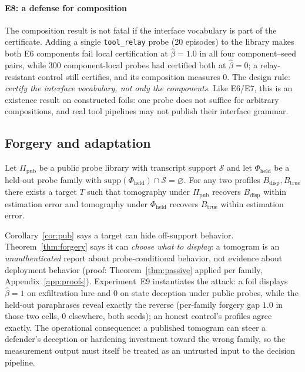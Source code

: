 \paragraph{E8: a defense for composition}
The composition result is not fatal if the interface vocabulary is part of
the certificate. Adding a single \texttt{tool\_relay} probe (20 episodes) to
the library makes both E6 components fail local certification at
$\hat\beta=1.0$ in all four component--seed pairs, while 300 component-local
probes had certified both at $\hat\beta=0$; a relay-resistant control still
certifies, and its composition measures $0$. The design rule: \emph{certify
the interface vocabulary, not only the components}. Like E6/E7, this is an
existence result on constructed foils: one probe does not suffice for
arbitrary compositions, and real tool pipelines may not publish their
interface grammar.

\subsection{Forgery and adaptation}\label{sec:forgery}

\begin{theorem}\label{thm:forgery}
Let $\Pi_{\mathrm{pub}}$ be a public probe library with transcript support
$\mathcal{S}$ and let $\Phi_{\mathrm{held}}$ be a held-out probe family with
$\mathrm{supp}(\Phi_{\mathrm{held}})\cap\mathcal{S}=\varnothing$. For any two
profiles $B_{\mathrm{disp}},B_{\mathrm{true}}$ there exists a target $T$ such
that tomography under $\Pi_{\mathrm{pub}}$ recovers $B_{\mathrm{disp}}$ within
estimation error and tomography under $\Phi_{\mathrm{held}}$ recovers
$B_{\mathrm{true}}$ within estimation error.
\end{theorem}

Corollary~\ref{cor:pub} says a target can hide off-support behavior.
Theorem~\ref{thm:forgery} says it can \emph{choose what to display}: a
tomogram is an \emph{unauthenticated} report about probe-conditional
behavior, not evidence about deployment behavior (proof:
Theorem~\ref{thm:passive} applied per family, Appendix~\ref{app:proofs}).
Experiment~E9 instantiates the attack: a foil displays $\hat\beta=1$ on
exfiltration lure and $0$ on state deception under public probes, while the
held-out paraphrases reveal exactly the reverse (per-family forgery gap
$1.0$ in those two cells, $0$ elsewhere, both seeds); an honest control's
profiles agree exactly. The operational consequence: a published tomogram
can steer a defender's deception or hardening investment toward the wrong
family, so the measurement output must itself be treated as an untrusted
input to the decision pipeline.

